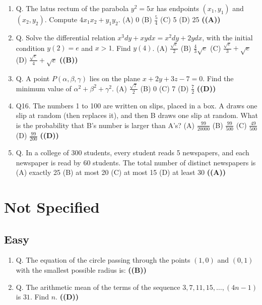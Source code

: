 \documentclass{article}
\begin{document}
\begin{enumerate}
$x^2 + y^2 + 2gx + 2fy + c = 0$.
Let AB be a chord of $\omega$ that subtends a right angle at the origin O. If $OP \perp AB$, then the
locus of the foot P is
(A) a parabola
(B) a circle
(C) an ellipse
(D) a straight line \hfill \textbf{((B))}
\item Q. The latus rectum of the parabola $y^2 = 5x$ has endpoints $(x_1,y_1)$ and $(x_2,y_2)$. Compute
$4x_1x_2 + y_1y_2$.
(A) 0
(B) $\frac{5}{4}$
(C) 5
(D) 25 \hfill \textbf{((A))}
\item Q. Solve the differential relation
$x^3dy + xydx = x^2 dy + 2y dx$,
with the initial condition $y(2) = e$ and $x > 1$. Find $y(4)$.
(A) $\frac{\sqrt{e}}{2}$
(B) $\frac{4}{3}\sqrt{e}$
(C) $\frac{\sqrt{e}}{3} + \sqrt{e}$
(D) $\frac{\sqrt{e}}{4} + \sqrt{e}$ \hfill \textbf{((B))}
\item Q. A point $P(\alpha, \beta, \gamma)$ lies on the plane
$x + 2y+3z - 7 = 0$.
Find the minimum value of $\alpha^2 + \beta^2 + \gamma^2$.
(A) $\frac{\sqrt{7}}{2}$
(B) 0
(C) 7
(D) $\frac{7}{2}$ \hfill \textbf{((D))}
\item Q16. The numbers 1 to 100 are written on slips, placed in a box. A draws one slip at
random (then replaces it), and then B draws one slip at random. What is the probability
that B's number is larger than A's?
(A) $\frac{99}{20000}$
(B) $\frac{99}{500}$
(C) $\frac{49}{500}$
(D) $\frac{99}{200}$ \hfill \textbf{((D))}
\item Q. In a college of 300 students, every student reads 5 newspapers, and each newspaper is
read by 60 students. The total number of distinct newspapers is
(A) exactly 25
(B) at most 20
(C) at most 15
(D) at least 30 \hfill \textbf{((A))}
\end{enumerate}
\section{Not Specified}
\subsection{Easy}
\begin{enumerate}
\item Q. The equation of the circle passing through the points $(1,0)$ and $(0,1)$ with the smallest possible radius is: \hfill \textbf{((B))}
\item Q. The arithmetic mean of the terms of the sequence $3, 7, 11, 15, \dots, (4n - 1)$ is $31$. Find $n$. \hfill \textbf{((D))}
\end{enumerate}
\end{document}
